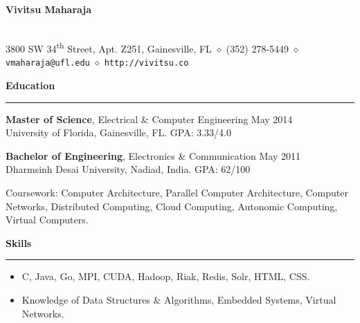 \documentclass[10pt]{article}
\begin{document}
\begin{center}
\textbf{\Large Vivitsu Maharaja}
\date{}
\thispagestyle{empty}
\smallskip \\
3800 SW 34\textsuperscript{th} Street, Apt. Z251, Gainesville, FL $\diamond$ (352) 278-5449 $\diamond$ \texttt{vmaharaja@ufl.edu} $\diamond$ \texttt{http://vivitsu.co}
\end{center}


\textbf{Education}
\smallskip
\hrule
{\bf Master of Science}, Electrical \& Computer Engineering \hfill May 2014\\
University of Florida, Gainesville, FL. \hfill GPA: 3.33/4.0

{\bf Bachelor of Engineering}, Electronics \& Communication \hfill May 2011\\
Dharmsinh Desai University, Nadiad, India. \hfill GPA: 62/100

Coursework: Computer Architecture, Parallel Computer Architecture, Computer Networks, Distributed Computing, Cloud Computing, Autonomic Computing, Virtual Computers.

\textbf{Skills}
\smallskip
\hrule
\begin{itemize}
    \item C, Java, Go, MPI, CUDA, Hadoop, Riak, Redis, Solr, HTML, CSS.
    \item Knowledge of Data Structures \& Algorithms, Embedded Systems, Virtual Networks.
\end{itemize} 
\end{document}
